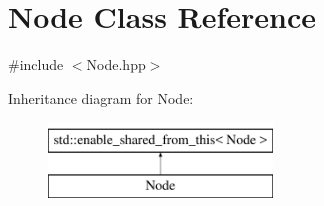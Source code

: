 \hypertarget{classNode}{}\section{Node Class Reference}
\label{classNode}


{\ttfamily \#include $<$Node.\+hpp$>$}

Inheritance diagram for Node\+:\begin{figure}[H]
\begin{center}
\leavevmode
\includegraphics[height=2.000000cm]{classNode}
\end{center}
\end{figure}
